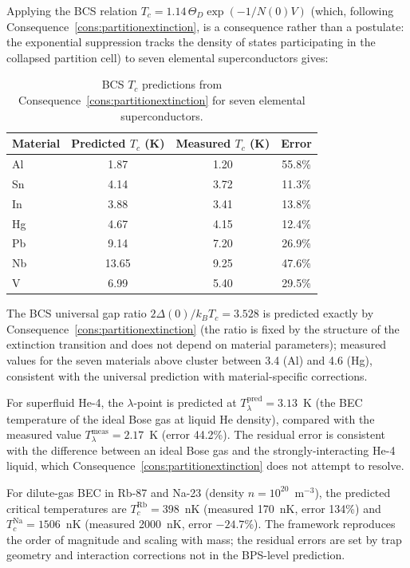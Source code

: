 \documentclass[11pt,twocolumn,a4paper]{article}
\theoremstyle{axiomstyle}
\theoremstyle{conseqstyle}
\theoremstyle{definition}
\theoremstyle{remark}
\begin{document}
Applying the BCS relation $T_c=1.14\,\Theta_D\exp(-1/N(0)V)$ (which, following Consequence~\ref{cons:partitionextinction}, is a consequence rather than a postulate: the exponential suppression tracks the density of states participating in the collapsed partition cell) to seven elemental superconductors gives:

\begin{table}[h]
\centering
\begin{tabular}{lccc}
\toprule
Material & Predicted $T_c$ (K) & Measured $T_c$ (K) & Error \\
\midrule
Al & 1.87 & 1.20 & 55.8\% \\
Sn & 4.14 & 3.72 & 11.3\% \\
In & 3.88 & 3.41 & 13.8\% \\
Hg & 4.67 & 4.15 & 12.4\% \\
Pb & 9.14 & 7.20 & 26.9\% \\
Nb & 13.65 & 9.25 & 47.6\% \\
V  & 6.99 & 5.40 & 29.5\% \\
\bottomrule
\end{tabular}
\caption{BCS $T_c$ predictions from Consequence~\ref{cons:partitionextinction} for seven elemental superconductors.}
\label{tab:superconductors}
\end{table}

The BCS universal gap ratio $2\Delta(0)/k_B T_c = 3.528$ is predicted exactly by Consequence~\ref{cons:partitionextinction} (the ratio is fixed by the structure of the extinction transition and does not depend on material parameters); measured values for the seven materials above cluster between 3.4 (Al) and 4.6 (Hg), consistent with the universal prediction with material-specific corrections.

For superfluid He-4, the $\lambda$-point is predicted at $T_\lambda^{\text{pred}} = 3.13$~K (the BEC temperature of the ideal Bose gas at liquid He density), compared with the measured value $T_\lambda^{\text{meas}} = 2.17$~K (error 44.2\%). The residual error is consistent with the difference between an ideal Bose gas and the strongly-interacting He-4 liquid, which Consequence~\ref{cons:partitionextinction} does not attempt to resolve.

For dilute-gas BEC in Rb-87 and Na-23 (density $n = 10^{20}$~m$^{-3}$), the predicted critical temperatures are $T_c^{\text{Rb}} = 398$~nK (measured 170~nK, error 134\%) and $T_c^{\text{Na}} = 1506$~nK (measured 2000~nK, error $-24.7$\%). The framework reproduces the order of magnitude and scaling with mass; the residual errors are set by trap geometry and interaction corrections not in the BPS-level prediction.
\end{document}
